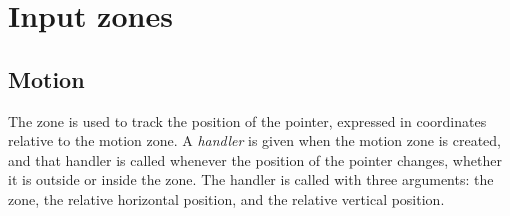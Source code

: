 
\section{Input zones}
\label{sec-zones-input}

\subsection{Motion}
\label{sec-zones-input-motion}

The  zone is used to track the position of the pointer,
expressed in coordinates relative to the motion zone.  A
\emph{handler} is given when the motion zone is created, and that
handler is called whenever the position of the pointer changes,
whether it is outside or inside the zone.  The handler is called with
three arguments: the zone, the relative horizontal position, and the
relative vertical position. 


